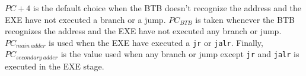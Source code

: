 $PC + 4$ is the default choice when the BTB doesn't recognize the address and the EXE have not executed a branch or a jump. $PC_{BTB}$ is taken whenever the BTB recognizes the address and the EXE have not executed
any branch or jump. $PC_{main\ adder}$ is used when the EXE have executed a \verb|jr| or \verb|jalr|. Finally, $PC_{secondary\ adder}$ is the value used when any branch or jump except \verb|jr| and \verb|jalr| is
executed in the EXE stage.